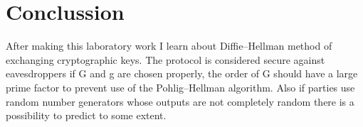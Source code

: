 \documentclass{article}
\begin{document}
 \section{Conclussion}


    After making this laboratory work I learn about Diffie–Hellman method of exchanging cryptographic keys. 
    The protocol is considered secure against eavesdroppers if G and g are chosen properly, the order of G should 
    have a large prime factor to prevent use of the Pohlig–Hellman algorithm. Also if parties use random number 
    generators whose outputs are not completely random there is a possibility to predict to some extent.
\end{document}
